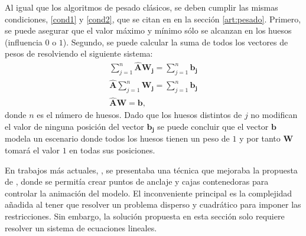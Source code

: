 Al igual que los algoritmos de pesado clásicos, se deben cumplir las mismas condiciones, \ref{cond1} y \ref{cond2}, que se citan en en la sección \ref{art:pesado}. %
Primero, se puede asegurar que el valor máximo y mínimo sólo se alcanzan en los huesos (influencia $0$ o $1$).
Segundo, se puede calcular la suma de todos los vectores de pesos de resolviendo el siguiente sistema:
\begin{eqnarray}
\sum^{n}_{j=1} \mathbf{\hat{A}} \mathbf{W_j} = \sum^{n}_{j=1} \mathbf{b_j} \\
\mathbf{\hat{A}} \sum^{n}_{j=1} \mathbf{W_j} = \sum^{n}_{j=1}\mathbf{b_j} \\
\mathbf{\hat{A}} \mathbf{W}=\mathbf{b},
\end{eqnarray}
donde $n$ es el número de huesos. Dado que los huesos distintos de $j$ no modifican el valor de ninguna posición del vector $\mathbf{b_j}$ se puede concluir que el vector $\mathbf{b}$ modela un escenario donde todos los huesos tienen un peso de $1$ y por tanto $\mathbf{W}$  tomará el valor $1$ en todas sus posiciones. 





En trabajos más actuales, \cite{Jacobson:2011}, se presentaba una técnica que mejoraba la propuesta de \cite{Baran:2007}, donde se permitía crear puntos de anclaje y cajas contenedoras para controlar la animación del modelo. 
El inconveniente principal es la complejidad añadida al tener que resolver un problema disperso y cuadrático para imponer las restricciones. Sin embargo, la solución propuesta en esta sección solo requiere resolver un sistema de ecuaciones lineales. 


